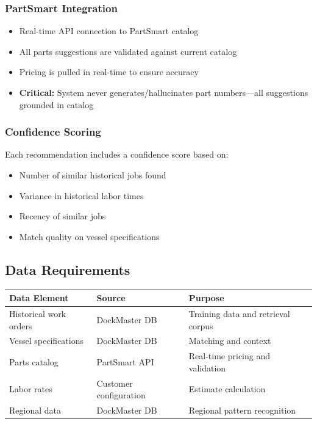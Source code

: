 \documentclass[11pt,a4paper]{article}
\begin{document}
\subsubsection{PartSmart Integration}
\begin{itemize}[leftmargin=*]
    \item Real-time API connection to PartSmart catalog
    \item All parts suggestions are validated against current catalog
    \item Pricing is pulled in real-time to ensure accuracy
    \item \textbf{Critical:} System never generates/hallucinates part numbers---all suggestions grounded in catalog
\end{itemize}

\subsubsection{Confidence Scoring}
Each recommendation includes a confidence score based on:
\begin{itemize}[leftmargin=*]
    \item Number of similar historical jobs found
    \item Variance in historical labor times
    \item Recency of similar jobs
    \item Match quality on vessel specifications
\end{itemize}

\subsection{Data Requirements}

\begin{table}[H]
\centering
\small
\begin{tabularx}{\textwidth}{@{}L{3.5cm}L{3.5cm}L{6cm}@{}}
\toprule
\textbf{Data Element} & \textbf{Source} & \textbf{Purpose} \\
\midrule
Historical work orders & DockMaster DB & Training data and retrieval corpus \\
Vessel specifications & DockMaster DB & Matching and context \\
Parts catalog & PartSmart API & Real-time pricing and validation \\
Labor rates & Customer configuration & Estimate calculation \\
Regional data & DockMaster DB & Regional pattern recognition \\
\bottomrule
\end{tabularx}
\end{table}
\end{document}
